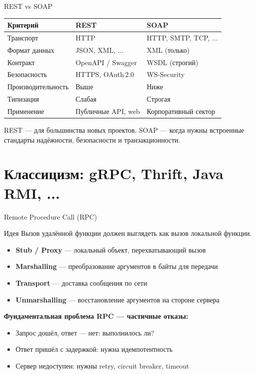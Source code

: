 \documentclass{beamer}
\begin{document}
\begin{frame}{REST vs SOAP}
\begin{center}
\begin{tabular}{lll}
\textbf{Критерий}      & \textbf{REST}          & \textbf{SOAP}                \\ \hline
Транспорт              & HTTP                   & HTTP, SMTP, TCP, ...         \\
Формат данных          & JSON, XML, ...         & XML (только)                 \\
Контракт               & OpenAPI / Swagger      & WSDL (строгий)               \\
Безопасность           & HTTPS, OAuth\,2.0      & WS-Security                  \\
Производительность     & Выше                   & Ниже                         \\
Типизация              & Слабая                 & Строгая                      \\
Применение             & Публичные API, web     & Корпоративный сектор         \\
\end{tabular}
\end{center}
\vspace{0.3cm}
REST --- для большинства новых проектов. SOAP --- когда нужны встроенные стандарты надёжности, безопасности и транзакционности.
\end{frame}

\section{Классицизм: gRPC, Thrift, Java RMI, ...}

\begin{frame}{Remote Procedure Call (RPC)}
\begin{block}{Идея}
  Вызов удалённой функции должен выглядеть как вызов локальной функции.
\end{block}
\begin{itemize}
  \item \textbf{Stub / Proxy} --- локальный объект, перехватывающий вызов
  \item \textbf{Marshalling} --- преобразование аргументов в байты для передачи
  \item \textbf{Transport} --- доставка сообщения по сети
  \item \textbf{Unmarshalling} --- восстановление аргументов на стороне сервера
\end{itemize}
\vspace{0.3cm}
\textbf{Фундаментальная проблема RPC --- частичные отказы:}
\begin{itemize}
  \item Запрос дошёл, ответ --- нет: выполнилось ли?
  \item Ответ пришёл с задержкой: нужна идемпотентность
  \item Сервер недоступен: нужны retry, circuit breaker, timeout
\end{itemize}
\end{frame}
\end{document}
